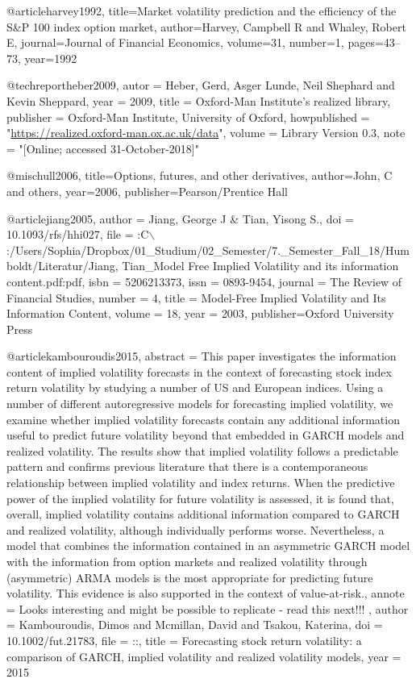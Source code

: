 @article{harvey1992,
  title={Market volatility prediction and the efficiency of the S\&P 100 index option market},
  author={Harvey, Campbell R and Whaley, Robert E},
  journal={Journal of Financial Economics},
  volume={31},
  number={1},
  pages={43--73},
  year={1992}
}

@techreport{heber2009,
autor = {Heber, Gerd, Asger Lunde, Neil Shephard and Kevin Sheppard},
year = {2009},
title = {Oxford-Man Institute's realized library},
publisher = {Oxford-Man Institute, University of Oxford},
howpublished = "\url{https://realized.oxford-man.ox.ac.uk/data}",
volume = {Library Version 0.3},
note = "[Online; accessed 31-October-2018]"
}

@misc{hull2006,
  title={Options, futures, and other derivatives},
  author={John, C and others},
  year={2006},
  publisher={Pearson/Prentice Hall}
}

@article{jiang2005,
author = {{Jiang, George J {\&} Tian}, Yisong S.},
doi = {10.1093/rfs/hhi027},
file = {:C$\backslash$:/Users/Sophia/Dropbox/01{\_}Studium/02{\_}Semester/7.{\_}Semester{\_}Fall{\_}18/Humboldt/Literatur/Jiang, Tian{\_}Model Free Implied Volatility and its information content.pdf:pdf},
isbn = {5206213373},
issn = {0893-9454},
journal = {The Review of Financial Studies},
number = {4},
title = {{Model-Free Implied Volatility and Its Information Content}},
volume = {18},
year = {2003},
publisher={Oxford University Press}
}


@article{kambouroudis2015,
abstract = {This paper investigates the information content of implied volatility forecasts in the context of forecasting stock index return volatility by studying a number of US and European indices. Using a number of different autoregressive models for forecasting implied volatility, we examine whether implied volatility forecasts contain any additional information useful to predict future volatility beyond that embedded in GARCH models and realized volatility. The results show that implied volatility follows a predictable pattern and confirms previous literature that there is a contemporaneous relationship between implied volatility and index returns. When the predictive power of the implied volatility for future volatility is assessed, it is found that, overall, implied volatility contains additional information compared to GARCH and realized volatility, although individually performs worse. Nevertheless, a model that combines the information contained in an asymmetric GARCH model with the information from option markets and realized volatility through (asymmetric) ARMA models is the most appropriate for predicting future volatility. This evidence is also supported in the context of value-at-risk.},
annote = {Looks interesting and might be possible to replicate - read this next!!! 
},
author = {Kambouroudis, Dimos and Mcmillan, David and Tsakou, Katerina},
doi = {10.1002/fut.21783},
file = {::},
title = {{Forecasting stock return volatility: a comparison of GARCH, implied volatility and realized volatility models}},
year = {2015}
}


